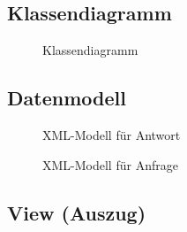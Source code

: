 
\clearpage

\subsection{Klassendiagramm}
\label{app:Klassendiagramm}
\begin{figure}[!htb]
\centering
{}
\caption{Klassendiagramm}
\end{figure}
\clearpage

\subsection{Datenmodell}
\label{app:Datenmodell}
\begin{figure}[h]
    \centering
    \caption{XML-Modell für Antwort}        
\end{figure}
\begin{figure}[!htb]
    \centering
    \caption{XML-Modell für Anfrage}
\end{figure}
\clearpage


\subsection{View (Auszug)}
\label{app:ListingView}

\clearpage


\clearpage

